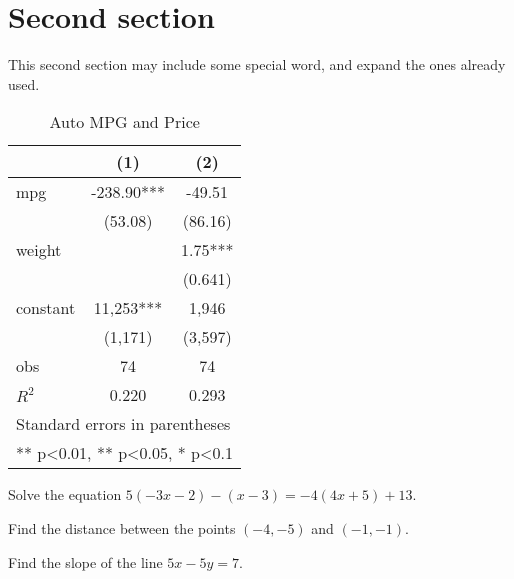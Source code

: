 \section{Second section}
This second section may include some special word,
and expand the ones already used.


\begin{table}[htbp]
    \small
    \centering
    \caption{Auto MPG and Price \label{tab:reg}}
    \begin{tabular}{lcc}
        \toprule
        & (1)        & (2)     \\
        \midrule
        mpg      & -238.90*** & -49.51  \\
        & (53.08)    & (86.16) \\
        weight   &            & 1.75*** \\
        &            & (0.641) \\
        constant & 11,253***  & 1,946   \\
        & (1,171)    & (3,597) \\
        obs      & 74         & 74      \\
        $R^2$    & 0.220      & 0.293   \\
        \bottomrule
        \multicolumn{3}{l}{\scriptsize Standard errors in parentheses} \\
        \multicolumn{3}{l}{\scriptsize *** p<0.01, ** p<0.05, * p<0.1} \\
    \end{tabular}%
\end{table}%

\begin{problemset}
    \item Solve the equation $5(- 3x - 2) - (x - 3) = -4(4x + 5) + 13$.
    \item Find the distance between the points $(-4 , -5)$ and $(-1 , -1)$.
    \item Find the slope of the line $5x - 5y = 7$.
\end{problemset}
